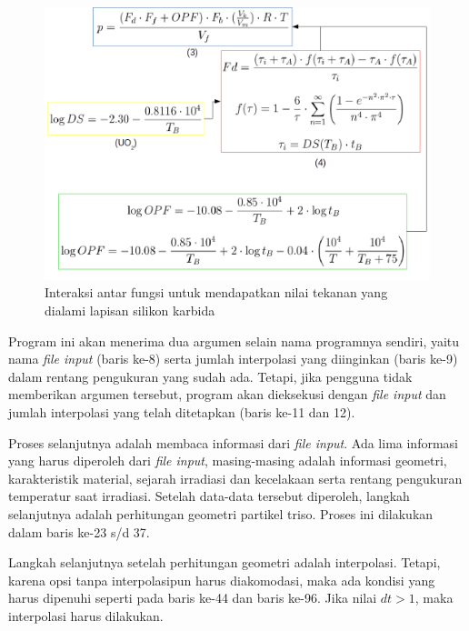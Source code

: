 \documentclass[a4paper,11pt]{report}
\begin{document}

\begin{figure}[h]
  \begin{center}
    \includegraphics[scale=.5]{pics/alurRumus2.png}
    \caption{Interaksi antar fungsi untuk mendapatkan nilai tekanan yang dialami lapisan silikon karbida}
    \label{fig:interaksiformula2}
  \end{center}
\end{figure}

Program ini akan menerima dua argumen selain nama programnya sendiri, yaitu nama \textit{file input} (baris ke-8) serta jumlah interpolasi yang diinginkan (baris ke-9) dalam rentang pengukuran yang sudah ada. Tetapi, jika pengguna tidak memberikan argumen tersebut, program akan dieksekusi dengan \textit{file input} dan jumlah interpolasi yang telah ditetapkan (baris ke-11 dan 12).

Proses selanjutnya adalah membaca informasi dari \textit{file input}. Ada lima informasi yang harus diperoleh dari \textit{file input}, masing-masing adalah
informasi geometri, karakteristik material, sejarah irradiasi dan kecelakaan serta rentang pengukuran temperatur saat irradiasi. Setelah data-data tersebut diperoleh, langkah selanjutnya adalah perhitungan geometri partikel triso. Proses ini dilakukan dalam baris ke-23 s/d 37.

Langkah selanjutnya setelah perhitungan geometri adalah interpolasi. Tetapi, karena opsi tanpa interpolasipun harus diakomodasi, maka ada kondisi yang harus dipenuhi seperti pada baris ke-44 dan baris ke-96. Jika nilai $dt>1$, maka interpolasi harus dilakukan.






\begin{appendix}
	
	\setcounter{page}{2}
	
\end{appendix}
\end{document}
